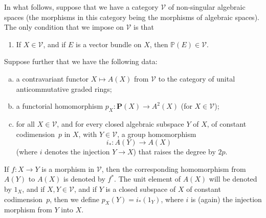 \documentclass{article}
\theoremstyle{plain}
\theoremstyle{definition}
\newcommand{\cat}{\mathcal}
\newcommand{\PP}{\mathbf{P}}
\newcommand{\oldpage}[1]{\marginpar{\footnotesize$\Big\vert$ \textit{p.~#1}}}
\begin{document}
\oldpage{140}

In what follows, suppose that we have a category $\cat{V}$ of non-singular algebraic spaces (the morphisms in this category being the morphisms of algebraic spaces).
The only condition that we impose on $\cat{V}$ is that
\begin{enumerate}[({V}1)]
  \item\label{axiomV1}
    If $X\in\cat{V}$, and if $E$ is a vector bundle on $X$, then $\mathbb{P}(E)\in\cat{V}$.
\end{enumerate}

Suppose further that we have the following data:
\begin{enumerate}[a.]
  \item\label{dataa}
    a contravariant functor $X\mapsto A(X)$ from $\cat{V}$ to the category of unital anticommutative graded rings;
  \item\label{datab}
    a functorial homomorphism $p_X\colon\PP(X)\to A^2(X)$ (for $X\in\cat{V}$);
  \item\label{datac}
    for all $X\in\cat{V}$, and for every closed algebraic subspace $Y$ of $X$, of constant codimension~$p$ in $X$, with $Y\in\cat{V}$, a group homomorphism
    \[
      i_*\colon A(Y)\to A(X)
    \]
    (where $i$ denotes the injection $Y\to X$) that raises the degree by $2p$.
\end{enumerate}

If $f\colon X\to Y$ is a morphism in $\cat{V}$, then the corresponding homomorphism from $A(Y)$ to $A(X)$ is denoted by $f^*$.
The unit element of $A(X)$ will be denoted by $1_X$, and if $X,Y\in\cat{V}$, and if $Y$ is a closed subspace of $X$ of constant codimension~$p$, then we define $p_X(Y)=i_*(1_Y)$, where $i$ is (again) the injection morphism from $Y$ into $X$.
\end{document}
